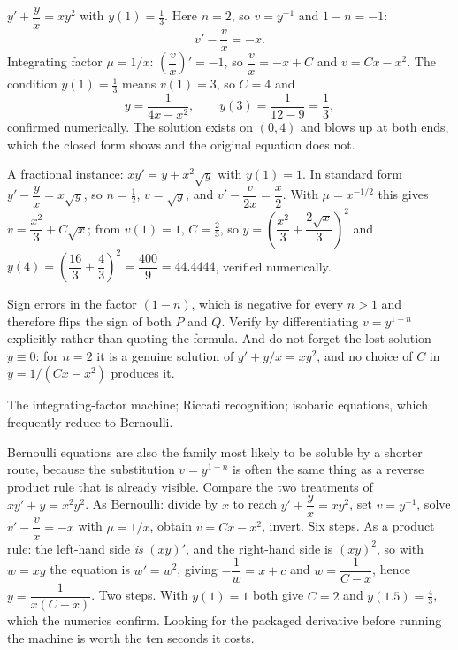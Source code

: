\begin{worked}
$y'+\dfrac yx=xy^{2}$ with $y(1)=\tfrac13$. Here $n=2$, so $v=y^{-1}$ and $1-n=-1$:
\[v'-\frac vx=-x.\]
Integrating factor $\mu=1/x$: $\left(\dfrac vx\right)'=-1$, so $\dfrac vx=-x+C$ and $v=Cx-x^{2}$. The condition $y(1)=\tfrac13$ means $v(1)=3$, so $C=4$ and
\[y=\frac{1}{4x-x^{2}},\qquad y(3)=\frac{1}{12-9}=\frac13,\]
confirmed numerically. The solution exists on $(0,4)$ and blows up at both ends, which the closed form shows and the original equation does not.

A fractional instance: $xy'=y+x^{2}\sqrt y$ with $y(1)=1$. In standard form $y'-\dfrac yx=x\sqrt y$, so $n=\tfrac12$, $v=\sqrt y$, and $v'-\dfrac{v}{2x}=\dfrac x2$. With $\mu=x^{-1/2}$ this gives $v=\dfrac{x^{2}}{3}+C\sqrt x$; from $v(1)=1$, $C=\tfrac23$, so $y=\left(\dfrac{x^{2}}{3}+\dfrac{2\sqrt x}{3}\right)^{2}$ and $y(4)=\left(\dfrac{16}{3}+\dfrac43\right)^{2}=\dfrac{400}{9}=44.4444$, verified numerically.
\end{worked}

\begin{trap}
Sign errors in the factor $(1-n)$, which is negative for every $n>1$ and therefore flips the sign of both $P$ and $Q$. Verify by differentiating $v=y^{1-n}$ explicitly rather than quoting the formula. And do not forget the lost solution $y\equiv0$: for $n=2$ it is a genuine solution of $y'+y/x=xy^{2}$, and no choice of $C$ in $y=1/(Cx-x^{2})$ produces it.
\end{trap}

\begin{seealsob}The integrating-factor machine; Riccati recognition; isobaric equations, which frequently reduce to Bernoulli.\end{seealsob}

Bernoulli equations are also the family most likely to be soluble by a shorter route, because the substitution $v=y^{1-n}$ is often the same thing as a reverse product rule that is already visible. Compare the two treatments of $xy'+y=x^{2}y^{2}$. As Bernoulli: divide by $x$ to reach $y'+\dfrac yx=xy^{2}$, set $v=y^{-1}$, solve $v'-\dfrac vx=-x$ with $\mu=1/x$, obtain $v=Cx-x^{2}$, invert. Six steps. As a product rule: the left-hand side \emph{is} $(xy)'$, and the right-hand side is $(xy)^{2}$, so with $w=xy$ the equation is $w'=w^{2}$, giving $-\dfrac1w=x+c$ and $w=\dfrac{1}{C-x}$, hence $y=\dfrac{1}{x(C-x)}$. Two steps. With $y(1)=1$ both give $C=2$ and $y(1.5)=\tfrac43$, which the numerics confirm. Looking for the packaged derivative before running the machine is worth the ten seconds it costs.

